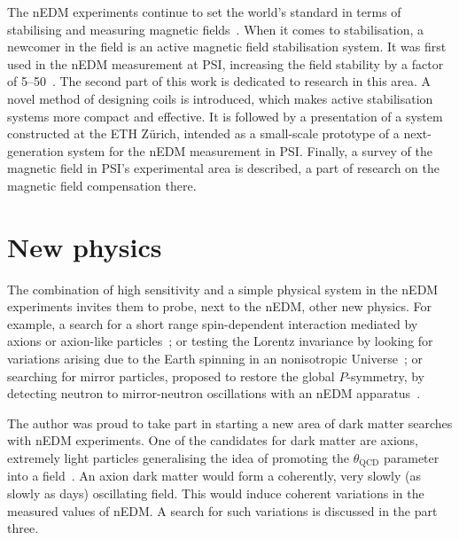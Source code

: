 The nEDM experiments continue to set the world's standard in terms of stabilising and measuring magnetic fields~\cite{GREEN1998381,1748-0221-10-12-P12003,Groeger2005,Baker2014}. When it comes to stabilisation, a newcomer in the field is an active magnetic field stabilisation system. It was first used in the nEDM measurement at PSI, increasing the field stability by a factor of 5--50~\cite{Afach2014}. The second part of this work is dedicated to research in this area. A novel method of designing coils is introduced, which makes active stabilisation systems more compact and effective. It is followed by a presentation of a system constructed at the ETH Zürich, intended as a small-scale prototype of a next-generation system for the nEDM measurement in PSI. Finally, a survey of the magnetic field in PSI's experimental area is described, a part of research on the magnetic field compensation there.



\section{New physics}
The combination of high sensitivity and a simple physical system in the nEDM experiments invites them to probe, next to the nEDM, other new physics. For example, a search for a short range spin-dependent interaction mediated by axions or axion-like particles~\cite{Afach2015Exotic}; or testing the Lorentz invariance by looking for variations arising due to the Earth spinning in an nonisotropic Universe~\cite{Altarev2009,ALTAREV20112365}; or searching for mirror particles, proposed to restore the global $P$-symmetry, by detecting neutron to mirror-neutron oscillations with an nEDM apparatus~\cite{PhysRevD.80.032003}.

The author was proud to take part in starting a new area of dark matter searches with nEDM experiments. One of the candidates for dark matter are axions, extremely light particles generalising the idea of promoting the $\theta_\text{QCD}$ parameter into a field~\cite{PhysRevLett.38.1440}. An axion dark matter would form a coherently, very slowly (as slowly as days) oscillating field. This would induce coherent variations in the measured values of nEDM. A search for such variations is discussed in the part three.